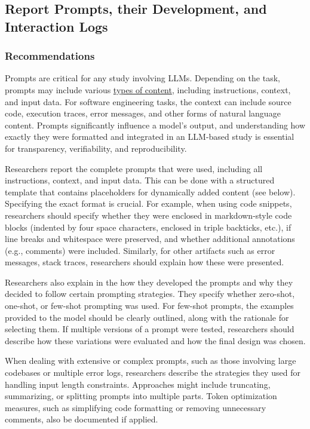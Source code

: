 



\subsection{Report Prompts, their Development, and Interaction Logs}


\subsubsection{Recommendations}

Prompts are critical for any study involving LLMs.
Depending on the task, prompts may include various \href{https://www.promptingguide.ai/introduction/elements}{types of content}, including instructions, context, and input data.
For software engineering tasks, the context can include source code, execution traces, error messages, and other forms of natural language content.
Prompts significantly influence a model’s output, and understanding how exactly they were formatted and integrated in an LLM-based study is essential for transparency, verifiability, and reproducibility.

Researchers \must report the complete prompts that were used, including all instructions, context, and input data.
This can be done with a structured template that contains placeholders for dynamically added content (see below).
Specifying the exact format is crucial.
For example, when using code snippets, researchers should specify whether they were enclosed in markdown-style code blocks (indented by four space characters, enclosed in triple backticks, etc.), if line breaks and whitespace were preserved, and whether additional annotations (e.g., comments) were included.
Similarly, for other artifacts such as error messages, stack traces, researchers should explain how these were presented.

Researchers \must also explain in the \paper how they developed the prompts and why they decided to follow certain prompting strategies.
They \must specify whether zero-shot, one-shot, or few-shot prompting was used. For few-shot prompts, the examples provided to the model should be clearly outlined, along with the rationale for selecting them.
If multiple versions of a prompt were tested, researchers should describe how these variations were evaluated and how the final design was chosen.

When dealing with extensive or complex prompts, such as those involving large codebases or multiple error logs, researchers \must describe the strategies they used for handling input length constraints.
Approaches might include truncating, summarizing, or splitting prompts into multiple parts.
Token optimization measures, such as simplifying code formatting or removing unnecessary comments, \must also be documented if applied.

